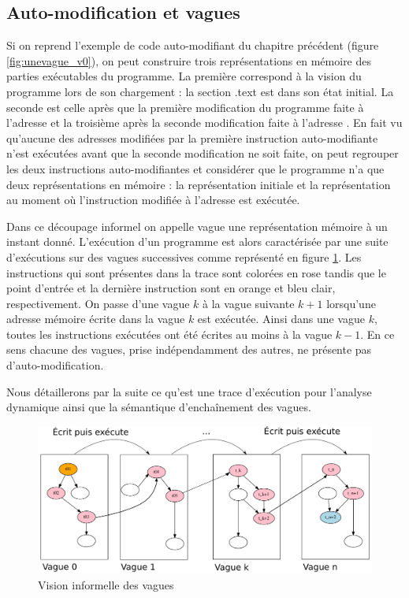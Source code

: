 \subsection{Auto-modification et vagues}
Si on reprend l'exemple de code auto-modifiant du chapitre précédent (figure \ref{fig:unevague_v0}), on peut construire trois représentations en mémoire des parties exécutables du programme.
La première correspond à la vision du programme lors de son chargement : la section .text est dans son état initial.
La seconde est celle après que la première modification du programme faite à l'adresse  et la troisième après la seconde modification faite à l'adresse .
En fait vu qu'aucune des adresses modifiées par la première instruction auto-modifiante n'est exécutées avant que la seconde modification ne soit faite, on peut regrouper les deux instructions auto-modifiantes et considérer que le programme n'a que deux représentations en mémoire : la représentation initiale et la représentation au moment où l'instruction modifiée à l'adresse  est exécutée.

Dans ce découpage informel on appelle vague une représentation mémoire à un instant donné. 
L'exécution d'un programme est alors caractérisée par une suite d'exécutions sur des vagues successives comme représenté en figure \ref{fig:vagues_visuel}. Les instructions qui sont présentes dans la trace sont colorées en rose tandis que le point d'entrée et la dernière instruction sont en orange et bleu clair, respectivement.
On passe d'une vague $k$ à la vague suivante $k+1$ lorsqu'une adresse mémoire écrite dans la vague $k$ est exécutée.
Ainsi dans une vague $k$, toutes les instructions exécutées ont été écrites au moins à la vague $k-1$. 
En ce sens chacune des vagues, prise indépendamment des autres, ne présente pas d'auto-modification.

Nous détaillerons par la suite ce qu'est une trace d'exécution pour l'analyse dynamique ainsi que la sémantique d'enchaînement des vagues.

\begin{figure}
 \includegraphics[width=1.0\textwidth]{supports/automodification/phases2_final.pdf}
 \caption{Vision informelle des vagues}
 \label{fig:vagues_visuel}
\end{figure}


